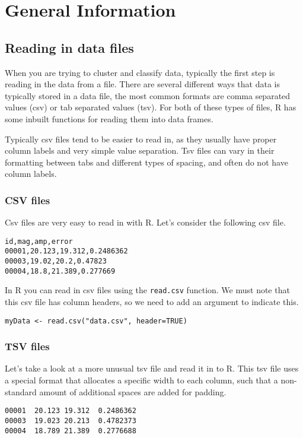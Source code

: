 \chapter{General Information}

\section{Reading in data files}
When you are trying to cluster and classify data, typically the first step is reading in the data from a file. There are several different ways that data is typically stored in a data file, the most common formats are comma separated values (csv) or tab separated values (tsv). For both of these types of files, R has some inbuilt functions for reading them into data frames.

Typically csv files tend to be easier to read in, as they usually have proper column labels and very simple value separation. Tsv files can vary in their formatting between tabs and different types of spacing, and often do not have column labels.

\subsection{CSV files}
Csv files are very easy to read in with R. Let's consider the following csv file.

\begin{verbatim}
id,mag,amp,error
00001,20.123,19.312,0.2486362
00003,19.02,20.2,0.47823
00004,18.8,21.389,0.277669
\end{verbatim}

In R you can read in csv files using the \verb|read.csv| function. We must note that this csv file has column headers, so we need to add an argument to indicate this.

\begin{verbatim}
myData <- read.csv("data.csv", header=TRUE)
\end{verbatim}

\subsection{TSV files}
Let's take a look at a more unusual tsv file and read it in to R. This tsv file uses a special format that allocates a specific width to each column, such that a non-standard amount of additional spaces are added for padding.

\begin{verbatim}
00001  20.123 19.312  0.2486362
00003  19.023 20.213  0.4782373
00004  18.789 21.389  0.2776688
\end{verbatim}

